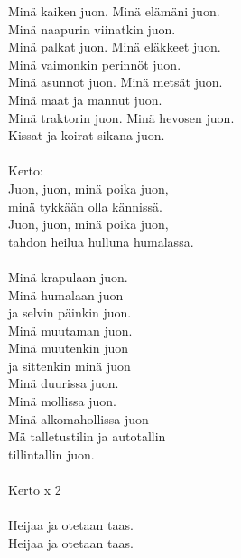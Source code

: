 
            Minä kaiken juon. Minä elämäni juon. \\
            Minä naapurin viinatkin juon. \\
            Minä palkat juon. Minä eläkkeet juon. \\
            Minä vaimonkin perinnöt juon. \\
            Minä asunnot juon. Minä metsät juon. \\
            Minä maat ja mannut juon. \\
            Minä traktorin juon. Minä hevosen juon. \\
            Kissat ja koirat sikana juon. \\
\hspace{10mm} \\
            Kerto: \\
            Juon, juon, minä poika juon, \\
            minä tykkään olla kännissä. \\
            Juon, juon, minä poika juon, \\
            tahdon heilua hulluna humalassa. \\
\hspace{10mm} \\
            Minä krapulaan juon. \\
            Minä humalaan juon \\
            ja selvin päinkin juon. \\
            Minä muutaman juon. \\
            Minä muutenkin juon \\
            ja sittenkin minä juon \\
            Minä duurissa juon. \\
            Minä mollissa juon. \\
            Minä alkomahollissa juon \\
            Mä talletustilin ja autotallin \\
            tillintallin juon. \\
\hspace{10mm} \\
            Kerto x 2 \\
\hspace{10mm} \\
            Heijaa ja otetaan taas. \\
            Heijaa ja otetaan taas. \\
